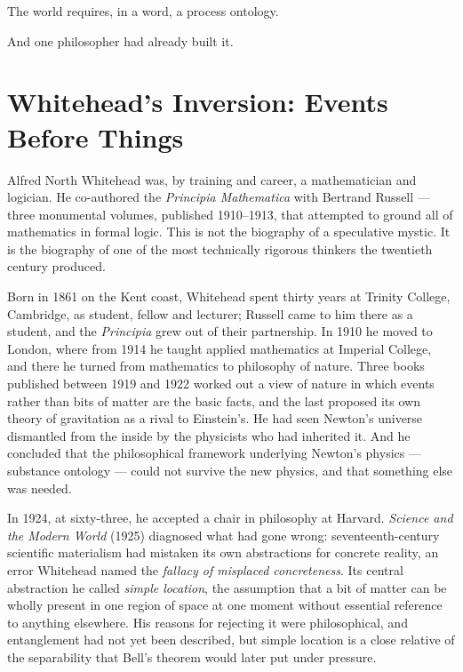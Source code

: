 The world requires, in a word, a process ontology.

And one philosopher had already built it.

\section{Whitehead's Inversion: Events Before Things}
\label{sec:ch2-whitehead-inversion}

Alfred North Whitehead was, by training and career, a mathematician and logician. He co-authored the \textit{Principia Mathematica} with Bertrand Russell --- three monumental volumes, published 1910--1913, that attempted to ground all of mathematics in formal logic. This is not the biography of a speculative mystic. It is the biography of one of the most technically rigorous thinkers the twentieth century produced.

Born in 1861 on the Kent coast, Whitehead spent thirty years at Trinity College, Cambridge, as student, fellow and lecturer; Russell came to him there as a student, and the \textit{Principia} grew out of their partnership. In 1910 he moved to London, where from 1914 he taught applied mathematics at Imperial College, and there he turned from mathematics to philosophy of nature. Three books published between 1919 and 1922 worked out a view of nature in which events rather than bits of matter are the basic facts, and the last proposed its own theory of gravitation as a rival to Einstein's. He had seen Newton's universe dismantled from the inside by the physicists who had inherited it. And he concluded that the philosophical framework underlying Newton's physics --- substance ontology --- could not survive the new physics, and that something else was needed.

In 1924, at sixty-three, he accepted a chair in philosophy at Harvard. \textit{Science and the Modern World} (1925) diagnosed what had gone wrong: seventeenth-century scientific materialism had mistaken its own abstractions for concrete reality, an error Whitehead named the \emph{fallacy of misplaced concreteness}. Its central abstraction he called \emph{simple location}, the assumption that a bit of matter can be wholly present in one region of space at one moment without essential reference to anything elsewhere. His reasons for rejecting it were philosophical, and entanglement had not yet been described, but simple location is a close relative of the separability that Bell's theorem would later put under pressure.

